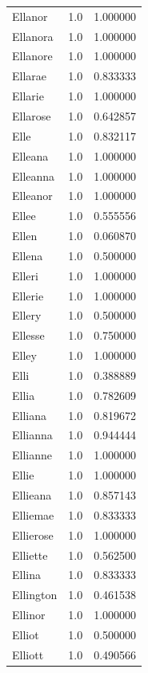 \documentclass[
  letterpaper,
  DIV=11,
  numbers=noendperiod]{scrreprt}
\begin{document}
\begin{tabular}{lrr}
Ellanor         &   1.0 &   1.000000 \\
Ellanora        &   1.0 &   1.000000 \\
Ellanore        &   1.0 &   1.000000 \\
Ellarae         &   1.0 &   0.833333 \\
Ellarie         &   1.0 &   1.000000 \\
Ellarose        &   1.0 &   0.642857 \\
Elle            &   1.0 &   0.832117 \\
Elleana         &   1.0 &   1.000000 \\
Elleanna        &   1.0 &   1.000000 \\
Elleanor        &   1.0 &   1.000000 \\
Ellee           &   1.0 &   0.555556 \\
Ellen           &   1.0 &   0.060870 \\
Ellena          &   1.0 &   0.500000 \\
Elleri          &   1.0 &   1.000000 \\
Ellerie         &   1.0 &   1.000000 \\
Ellery          &   1.0 &   0.500000 \\
Ellesse         &   1.0 &   0.750000 \\
Elley           &   1.0 &   1.000000 \\
Elli            &   1.0 &   0.388889 \\
Ellia           &   1.0 &   0.782609 \\
Elliana         &   1.0 &   0.819672 \\
Ellianna        &   1.0 &   0.944444 \\
Ellianne        &   1.0 &   1.000000 \\
Ellie           &   1.0 &   1.000000 \\
Ellieana        &   1.0 &   0.857143 \\
Elliemae        &   1.0 &   0.833333 \\
Ellierose       &   1.0 &   1.000000 \\
Elliette        &   1.0 &   0.562500 \\
Ellina          &   1.0 &   0.833333 \\
Ellington       &   1.0 &   0.461538 \\
Ellinor         &   1.0 &   1.000000 \\
Elliot          &   1.0 &   0.500000 \\
Elliott         &   1.0 &   0.490566 \\

\end{tabular}
\end{document}
